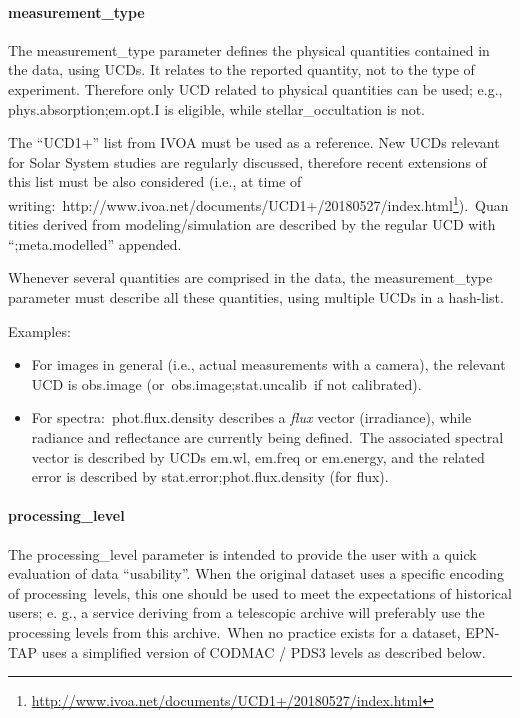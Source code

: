 \documentclass[11pt,a4paper]{ivoa}
\begin{document}
\paragraph{measurement\_type}

The measurement\_type parameter defines the physical quantities contained in the data, using UCDs. It relates to the reported quantity, not to the type of experiment. Therefore only UCD related to physical quantities can be used; e.g., phys.absorption;em.opt.I is eligible, while stellar\_occultation is not.

The ``UCD1+'' list from IVOA must be used as a reference. New UCDs relevant for Solar System studies are regularly discussed, therefore recent extensions of this list must be also considered (i.e., at time of writing: http://www.ivoa.net/documents/UCD1+/20180527/index.html\footnote{\url{http://www.ivoa.net/documents/UCD1+/20180527/index.html}}). Quantities derived from modeling/simulation are described by the regular UCD with ``;meta.modelled'' appended. 

Whenever several quantities are comprised in the data, the measurement\_type parameter must describe all these quantities, using multiple UCDs in a hash-list. 

Examples:

\begin{itemize}
\item For images in general (i.e., actual measurements with a camera), the relevant UCD is obs.image (or obs.image;stat.uncalib if not calibrated).
\item For spectra: phot.flux.density describes a \emph{flux} vector (irradiance), while radiance and reflectance are currently being defined. The associated spectral vector is described by UCDs em.wl, em.freq or em.energy, and the related error is described by stat.error;phot.flux.density (for flux).
\end{itemize}

\paragraph{processing\_level}

The processing\_level parameter is intended to provide the user with a quick evaluation of data ``usability''. When the original dataset uses a specific encoding of processing levels, this one should be used to meet the expectations of historical users; e. g., a service deriving from a telescopic archive will preferably use the processing levels from this archive. When no practice exists for a dataset, EPN-TAP uses a simplified version of CODMAC / PDS3 levels as described below.
\end{document}

